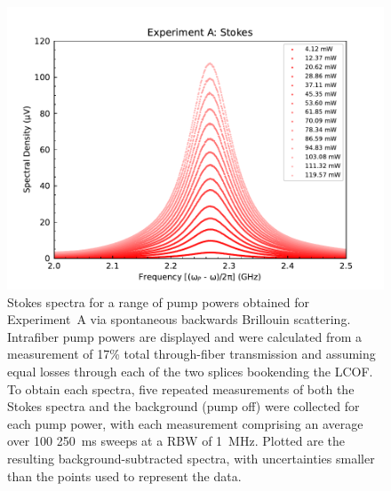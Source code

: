 \begin{figure}[t!]
  \centering
  \includegraphics[width=\textwidth]{figs/3-Cooling/P-O Stokes.pdf}
  \caption{Stokes spectra for a range of pump powers obtained for Experiment~A via spontaneous backwards Brillouin scattering. Intrafiber pump powers are displayed and were calculated from a measurement of 17\% total through-fiber transmission and assuming equal losses through each of the two splices bookending the \ac{LCOF}. To obtain each spectra, five repeated measurements of both the Stokes spectra and the background (pump off) were collected for each pump power, with each measurement comprising an average over 100 \SI{250}{\milli\second} sweeps at a \ac{RBW} of \SI{1}{\mega\hertz}. Plotted are the resulting background-subtracted spectra, with uncertainties smaller than the points used to represent the data.}
  \label{fig:Cooling:P-O Stokes}
\end{figure}

